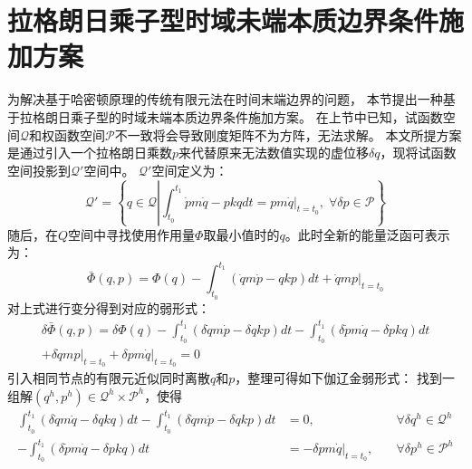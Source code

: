 \section{拉格朗日乘子型时域未端本质边界条件施加方案}

为解决基于哈密顿原理的传统有限元法在时间末端边界的问题，
本节提出一种基于拉格朗日乘子型的时域未端本质边界条件施加方案。
在上节中已知，试函数空间$\mathcal{Q}$和权函数空间$\mathcal{P}$不一致将会导致刚度矩阵不为方阵，无法求解。
本文所提方案是通过引入一个拉格朗日乘数$p$来代替原来无法数值实现的虚位移$\delta q$，现将试函数空间投影到$\mathcal{Q}'$空间中。
$\mathcal{Q}'$空间定义为：
\begin{equation}
\mathcal{Q}' = \left \{ q \in \mathcal{Q} \left \lvert \int_{t_0}^{t_1} \dot p m \dot q - p k q dt = pm\dot q \vert_{t=t_0}, \; \forall \delta p \in \mathcal{P} \right . \right \}
\end{equation}
随后，在$Q$空间中寻找使用作用量$\Phi$取最小值时的$q$。此时全新的能量泛函可表示为：
\begin{equation}\label{2.16}
\bar \Phi(q,p) = \Phi(q) - \int_{t_0}^{t_1} (\dot q m \dot p - q k p) dt + \dot q m p\vert_{t=t_0}
\end{equation}
对上式进行变分得到对应的弱形式：
\begin{multline}\label{delat Phi(u,p)}
    \delta \bar \Phi(q,p) = \delta \Phi(q) - \int_{t_0}^{t_1} (\delta \dot q m \dot p - \delta q k p) dt - \int_{t_0}^{t_1} (\delta \dot p m \dot q - \delta p k q) dt \\
    + \delta \dot q m p \vert_{t=t_0} + \delta p m \dot q \vert_{t=t_0} = 0
\end{multline}
引入相同节点的有限元近似同时离散$q$和$p$，整理可得如下伽辽金弱形式：
找到一组解$(q^h,p^h) \in \mathcal{Q}^h \times \mathcal{P}^h$，使得
\begin{equation}
    \begin{aligned}
        \int_{t_0}^{t_1} (\delta \dot q m \dot q - \delta q k q) dt - \int_{t_0}^{t_1} (\delta \dot q m \dot p - \delta q k p) dt &= 0, \quad & \forall \delta q^h \in \mathcal{Q}^h \\
        - \int_{t_0}^{t_1} (\delta \dot p m \dot q - \delta p k q) dt &= - \delta p m  \dot q \vert_{t=t_0}, \quad & \forall \delta p^h \in \mathcal{P}^h
    \end{aligned}
\end{equation}


